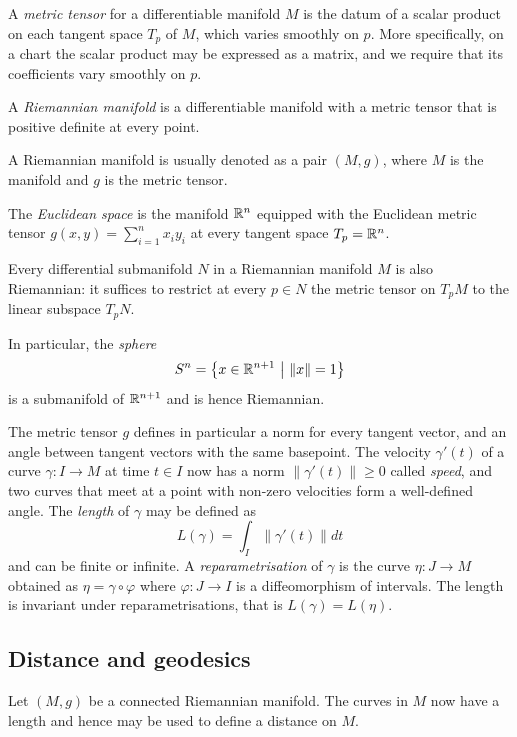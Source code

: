 A \emph{metric tensor} for a differentiable manifold $M$ is the datum of a scalar product on each tangent space $T_p$ of $M$, which varies smoothly on $p$. More specifically, on a chart the scalar product may be expressed as a matrix, and we require that its coefficients vary smoothly on $p$.

\begin{defn}
A \emph{Riemannian manifold} is a differentiable manifold with a metric tensor that is positive definite at every point.
\end{defn}

A Riemannian manifold is usually denoted as a pair $(M,g)$, where $M$ is the manifold and $g$ is the metric tensor. 

\begin{example}
The \emph{Euclidean space} is the manifold $\mathbb{R}^n$ equipped with the Euclidean metric tensor $g(x,y) = \sum_{i=1}^n x_iy_i$ at every tangent space $T_p = \mathbb{R}^n$.
\end{example}

\begin{example}
Every differential submanifold $N$ in a Riemannian manifold $M$ is also Riemannian: it suffices to restrict at every $p\in N$ the metric tensor on $T_pM$ to the linear subspace $T_pN$.

In particular, the \emph{sphere} 
$$S^n = \big\{x\in \mathbb{R}^{n+1}\ \big| \ \|x\| = 1 \big\}$$
is a submanifold of $\mathbb{R}^{n+1}$ and is hence Riemannian.
\end{example}

The metric tensor $g$ defines in particular a norm for every tangent vector, and an angle between tangent vectors with the same basepoint. The velocity $\gamma'(t)$ of a curve $\gamma \colon I \to M$ at time $t\in I$ now has a norm $\|\gamma'(t)\|\geqslant 0$ called \emph{speed}, and two curves that meet at a point with non-zero velocities form a well-defined angle. The \emph{length} of $\gamma$ may be defined as
$$L(\gamma) = \int_I \|\gamma'(t)\| dt$$
and can be finite or infinite. A \emph{reparametrisation} of $\gamma$ is the curve $\eta \colon J \to M$ obtained as $\eta = \gamma\circ\varphi$ where $\varphi\colon J\to I$ is a diffeomorphism of intervals. The length is invariant under reparametrisations, that is $L(\gamma) = L(\eta)$.

\subsection{Distance and geodesics}
Let $(M,g)$ be a connected Riemannian manifold. The curves in $M$ now have a length and hence may be used to define a distance on $M$. 

